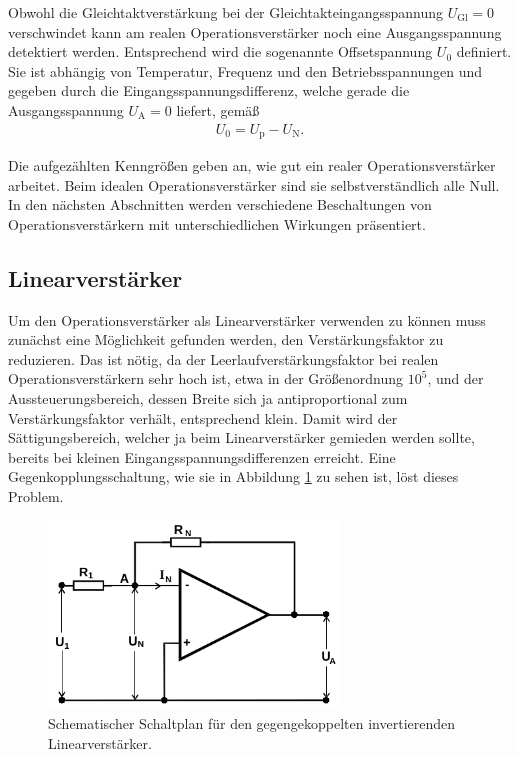 Obwohl die Gleichtaktverstärkung bei der Gleichtakteingangsspannung $U_\text{Gl} = 0$ verschwindet
kann am realen Operationsverstärker noch eine Ausgangsspannung detektiert werden. Entsprechend wird die sogenannte
Offsetspannung $U_0$ definiert. Sie ist abhängig von Temperatur, Frequenz und den Betriebsspannungen und gegeben
durch die Eingangsspannungsdifferenz, welche gerade die Ausgangsspannung $U_\text{A} = 0$ liefert, gemäß
\begin{align}
  U_0 = U_\text{p} - U_\text{N}.
\end{align}

Die aufgezählten Kenngrößen geben an, wie gut ein realer Operationsverstärker arbeitet. Beim idealen
Operationsverstärker sind sie selbstverständlich alle Null. In den nächsten Abschnitten werden verschiedene
Beschaltungen von Operationsverstärkern mit unterschiedlichen Wirkungen präsentiert.

\subsection{Linearverstärker}

Um den Operationsverstärker als Linearverstärker verwenden zu können muss zunächst eine Möglichkeit gefunden werden,
den Verstärkungsfaktor zu reduzieren. Das ist nötig, da der Leerlaufverstärkungsfaktor bei realen Operationsverstärkern
sehr hoch ist, etwa in der Größenordnung $10^5$, und der Aussteuerungsbereich, dessen Breite sich ja antiproportional
zum Verstärkungsfaktor verhält, entsprechend klein. Damit wird der Sättigungsbereich, welcher ja beim Linearverstärker
gemieden werden sollte, bereits bei kleinen Eingangsspannungsdifferenzen erreicht.
Eine Gegenkopplungsschaltung, wie sie in Abbildung \ref{fig:gegenkopplung} zu sehen ist, löst dieses Problem.

\begin{figure}
  \centering
  \includegraphics[height=5cm]{ImmerDieseNorweger/gegenkopplung.png}
  \caption{Schematischer Schaltplan für den gegengekoppelten invertierenden Linearverstärker\cite{anleitung}.}
  \label{fig:gegenkopplung}
\end{figure}

